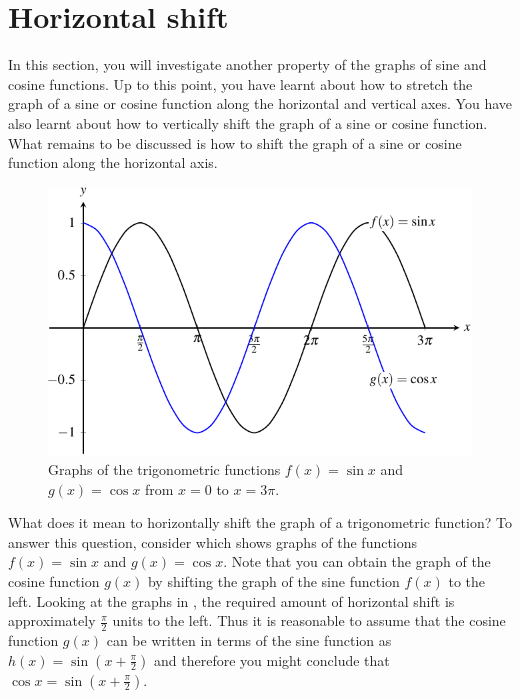 \documentclass[a4paper,oneside,12pt]{article}
\begin{document}

\section{Horizontal shift}

In this section, you will investigate another property of the graphs
of sine and cosine functions.  Up to this point, you have learnt about
how to stretch the graph of a sine or cosine function along the
horizontal and vertical axes.  You have also learnt about how to
vertically shift the graph of a sine or cosine function.  What remains
to be discussed is how to shift the graph of a sine or cosine function
along the horizontal axis.

\begin{figure}[!htbp]
\centering
\includegraphics[scale=1.1]{image/13/sin-cos.pdf}
\caption{%
  Graphs of the trigonometric functions $f(x) = \sin x$ and
  $g(x) = \cos x$ from $x = 0$ to $x = 3\pi$.
}
\label{fig:trigonometric:standard_sine_cosine}
\end{figure}

What does it mean to horizontally shift the graph of a trigonometric
function?  To answer this question, consider
 which shows graphs of
the functions $f(x) = \sin x$ and $g(x) = \cos x$.  Note that you can
obtain the graph of the cosine function $g(x)$ by shifting the graph
of the sine function $f(x)$ to the left.  Looking at the graphs in
, the required amount
of horizontal shift is approximately $\frac{\pi}{2}$ units to the
left.  Thus it is reasonable to assume that the cosine function $g(x)$
can be written in terms of the sine function as
$h(x) = \sin(x + \frac{\pi}{2})$ and therefore you might conclude that
$\cos x = \sin(x + \frac{\pi}{2})$.
\end{document}
